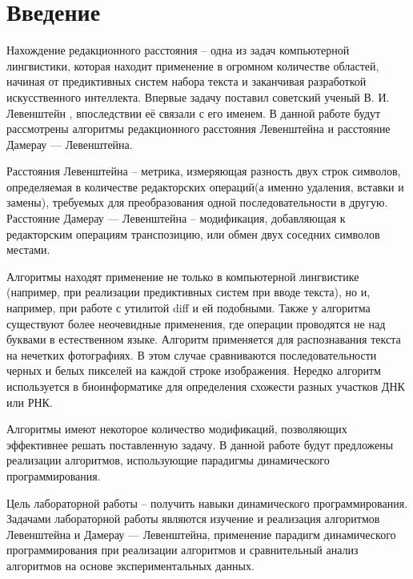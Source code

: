 \chapter{Введение}

Нахождение редакционного расстояния -- одна из задач компьютерной лингвистики, которая находит применение в огромном количестве областей, начиная от предиктивных систем набора текста и заканчивая разработкой искусственного интеллекта. Впервые задачу поставил советский ученый В. И. Левенштейн \cite{Lev1965}, впоследствии её связали с его именем. В данной работе будут рассмотрены алгоритмы редакционного расстояния Левенштейна и расстояние Дамерау — Левенштейна.

Расстояния Левенштейна -- метрика, измеряющая разность двух строк символов, определяемая в количестве редакторских операций(а именно удаления, вставки и замены), требуемых для преобразования одной последовательности в другую.  Расстояние Дамерау — Левенштейна -- модификация, добавляющая к редакторским операциям транспозицию, или обмен двух соседних символов местами.

Алгоритмы находят применение не только в компьютерной лингвистике (например, при реализации предиктивных систем при вводе текста), но и, например, при работе с утилитой diff и ей подобными. Также у алгоритма существуют более неочевидные применения, где операции проводятся не над буквами в естественном языке. Алгоритм применяется для распознавания текста на нечетких фотографиях. В этом случае сравниваются последовательности черных и белых пикселей на каждой строке изображения.
Нередко алгоритм используется в биоинформатике для определения схожести разных участков ДНК или РНК.

Алгоритмы имеют некоторое количество модификаций, позволяющих эффективнее решать поставленную задачу. В данной работе будут предложены реализации алгоритмов, использующие парадигмы динамического программирования.

Цель лабораторной работы -- получить навыки динамического программирования. 
Задачами лабораторной работы являются изучение и реализация алгоритмов Левенштейна и Дамерау — Левенштейна, применение парадигм динамического программирования при реализации алгоритмов и сравнительный анализ алгоритмов на основе экспериментальных данных.